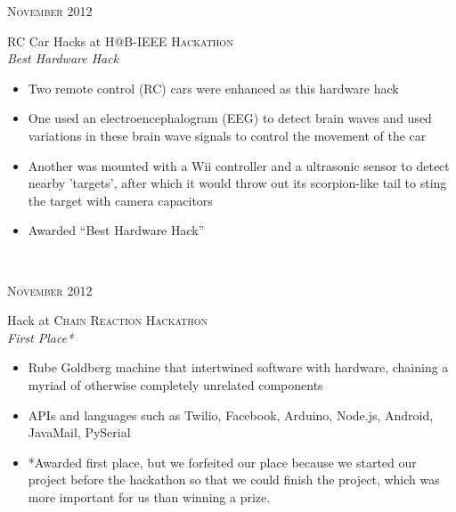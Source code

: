 \documentclass[10pt]{article} %
\begin{document}
{\begin{minipage}[t]{0.5\textwidth}

{\raggedleft\textsc{November 2012}\par}

{\raggedright\large RC Car Hacks at \textsc{H@B-IEEE Hackathon}\\
\textit{Best Hardware Hack}\\[5pt]}

\normalsize{
  \begin{itemize}
  \item Two remote control (RC) cars were enhanced as this hardware hack
  \item One used an electroencephalogram (EEG) to detect brain waves and
    used variations in these brain wave signals to control the movement of
    the car
  \item Another was mounted with a Wii controller and a ultrasonic sensor
    to detect nearby 'targets', after which it would throw out its
    scorpion-like tail to sting the target with camera capacitors
  \item Awarded ``Best Hardware Hack''
  \end{itemize}
}\\


{\raggedleft\textsc{November 2012}\par}

{\raggedright\large Hack at \textsc{Chain Reaction Hackathon}\\
\textit{First Place*}\\[5pt]}

\normalsize{
  \begin{itemize}
  \item Rube Goldberg machine that intertwined software with hardware,
    chaining a myriad of otherwise completely unrelated components
  \item APIs and languages such as Twilio, Facebook, Arduino, Node.js,
    Android, JavaMail, PySerial
  \item *Awarded first place, but we forfeited our place because we started
    our project before the hackathon so that we could finish the project,
    which was more important for us than winning a prize.
  \end{itemize}
}\\


\end{minipage}}
\end{document}
